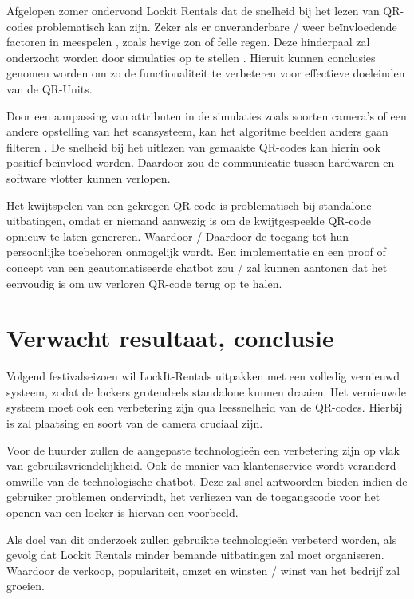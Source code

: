 \documentclass{hogent-article}
\begin{document}
Afgelopen zomer ondervond Lockit Rentals dat de snelheid bij het lezen van QR-codes problematisch kan zijn. Zeker als er onveranderbare / weer beïnvloedende factoren in meespelen \autocite{Dr2022}, zoals hevige zon of felle regen. 
Deze hinderpaal zal onderzocht worden door simulaties op te stellen \autocite{Skurowski2022}. Hieruit kunnen conclusies genomen worden om zo de functionaliteit te verbeteren voor effectieve doeleinden van de QR-Units. 

Door een aanpassing van attributen in de simulaties zoals soorten camera’s of een andere opstelling van het scansysteem, kan het algoritme beelden anders gaan filteren \autocite{Dr2022}. De snelheid bij het uitlezen van gemaakte QR-codes kan hierin ook positief beïnvloed worden. Daardoor zou de communicatie tussen hardwaren en software vlotter kunnen verlopen.

Het kwijtspelen van een gekregen QR-code is problematisch bij standalone uitbatingen, omdat er niemand aanwezig is om de kwijtgespeelde QR-code opnieuw te laten genereren. Waardoor / Daardoor de toegang tot hun persoonlijke toebehoren onmogelijk wordt.
Een implementatie en een proof of concept van een geautomatiseerde chatbot zou / zal kunnen aantonen dat het eenvoudig is om uw verloren QR-code terug op te halen.




\section{Verwacht resultaat, conclusie}%
\label{sec:verwachte_resultaten}

Volgend festivalseizoen wil LockIt-Rentals uitpakken met een volledig vernieuwd systeem, zodat de lockers grotendeels standalone kunnen draaien. Het vernieuwde systeem moet ook een verbetering zijn qua leessnelheid van de QR-codes. Hierbij is zal plaatsing en soort van de camera cruciaal zijn. 

Voor de huurder zullen de aangepaste technologieën een verbetering zijn op vlak van gebruiksvriendelijkheid. Ook de manier van klantenservice wordt veranderd omwille van de technologische chatbot. Deze zal snel antwoorden bieden indien de gebruiker problemen ondervindt, het verliezen van de toegangscode voor het openen van een locker is hiervan een voorbeeld.

Als doel van dit onderzoek zullen gebruikte technologieën verbeterd worden, als gevolg dat Lockit Rentals minder bemande uitbatingen zal moet organiseren. Waardoor de verkoop, populariteit, omzet en winsten / winst van het bedrijf zal groeien.



\printbibliography[heading=bibintoc]
\end{document}
